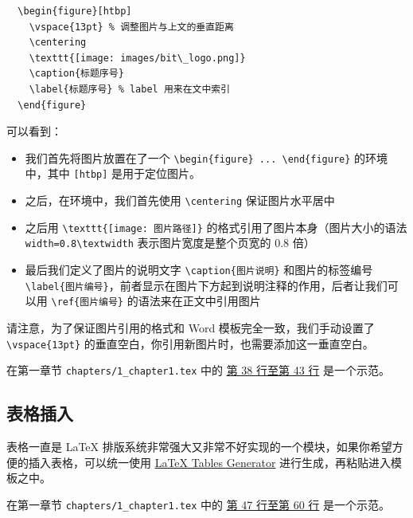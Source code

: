 \begin{verbatim}
  \begin{figure}[htbp]
    \vspace{13pt} % 调整图片与上文的垂直距离
    \centering
    \texttt{[image: images/bit\_logo.png]}
    \caption{标题序号}
    \label{标题序号} % label 用来在文中索引
  \end{figure}
\end{verbatim}

可以看到：

\begin{itemize}
  \item 我们首先将图片放置在了一个 \verb|\begin{figure} ... \end{figure}| 的环境中，其中 \texttt{[htbp]} 是用于定位图片。
  \item 之后，在环境中，我们首先使用 \verb|\centering| 保证图片水平居中
  \item 之后用 \verb|\texttt{[image: 图片路径]}| 的格式引用了图片本身（图片大小的语法 \verb|width=0.8\textwidth| 表示图片宽度是整个页宽的 0.8 倍）
  \item 最后我们定义了图片的说明文字 \verb|\caption{图片说明}| 和图片的标签编号 \verb|\label{图片编号}|，前者显示在图片下方起到说明注释的作用，后者让我们可以用 \verb|\ref{图片编号}| 的语法来在正文中引用图片
\end{itemize}

请注意，为了保证图片引用的格式和 Word 模板完全一致，我们手动设置了 \verb|\vspace{13pt}| 的垂直空白，你引用新图片时，也需要添加这一垂直空白。

在第一章节 \texttt{chapters/1\_chapter1.tex} 中的 \href{https://github.com/spencerwooo/BIThesis/blob/master/graduation-thesis/chapters/1_chapter1.tex#L38-L43}{第 38 行至第 43 行} 是一个示范。

\subsection{表格插入}

表格一直是 {\LaTeX} 排版系统非常强大又非常不好实现的一个模块，如果你希望方便的插入表格，可以统一使用 \href{https://www.tablesgenerator.com/}{LaTeX Tables Generator} 进行生成，再粘贴进入模板之中。

在第一章节 \texttt{chapters/1\_chapter1.tex} 中的 \href{https://github.com/spencerwooo/BIThesis/blob/master/graduation-thesis/chapters/1_chapter1.tex#L47-L60}{第 47 行至第 60 行} 是一个示范。

